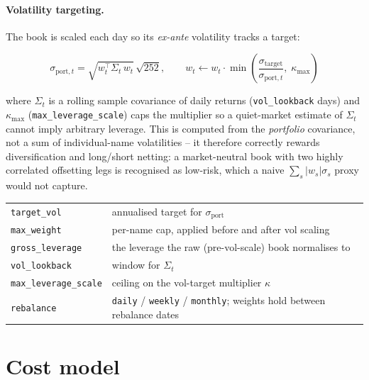 \paragraph{Volatility targeting.} The book is scaled each day so its
\emph{ex-ante} volatility tracks a target:

\begin{equation}
  \sigma_{\text{port},t} = \sqrt{w_t^\top \Sigma_t\, w_t}\,\sqrt{252},
  \qquad
  w_t \leftarrow w_t \cdot \min\!\left(\frac{\sigma_{\text{target}}}{\sigma_{\text{port},t}},\; \kappa_{\max}\right)
\end{equation}

where $\Sigma_t$ is a rolling sample covariance of daily returns
(\texttt{vol\_lookback} days) and $\kappa_{\max}$
(\texttt{max\_leverage\_scale}) caps the multiplier so a quiet-market estimate
of $\Sigma_t$ cannot imply arbitrary leverage. This is computed from the
\emph{portfolio} covariance, not a sum of individual-name volatilities --
it therefore correctly rewards diversification and long/short netting: a
market-neutral book with two highly correlated offsetting legs is recognised
as low-risk, which a naive $\sum_s |w_s|\sigma_s$ proxy would not capture.

\begin{table}[h]
\footnotesize
\centering
\begin{tabularx}{\textwidth}{L{4.4cm} X}
\toprule
{} &  \\
\midrule
\texttt{target\_vol} & annualised target for $\sigma_{\text{port}}$ \\
\texttt{max\_weight} & per-name cap, applied before and after vol scaling \\
\texttt{gross\_leverage} & the leverage the raw (pre-vol-scale) book normalises to \\
\texttt{vol\_lookback} & window for $\Sigma_t$ \\
\texttt{max\_leverage\_scale} & ceiling on the vol-target multiplier $\kappa$ \\
\texttt{rebalance} & \texttt{daily} / \texttt{weekly} / \texttt{monthly}; weights hold between rebalance dates \\
\bottomrule
\end{tabularx}
\end{table}

\section{Cost model}

